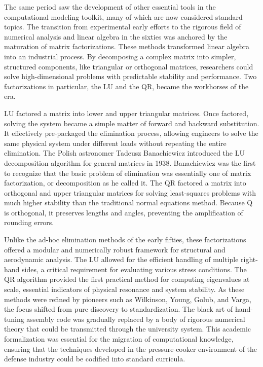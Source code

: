 The same period saw the development of other essential tools in the computational modeling toolkit, many of which are now considered standard topics. The transition from experimental early efforts to the rigorous field of numerical analysis and linear algebra in the sixties was anchored by the maturation of matrix factorizations. These methods transformed linear algebra into an industrial process. By decomposing a complex matrix into simpler, structured components, like triangular or orthogonal matrices, researchers could solve high-dimensional problems with predictable stability and performance. Two factorizations in particular, the LU and the QR, became the workhorses of the era. 

LU factored a matrix into lower and upper triangular matrices. Once factored, solving the system became a simple matter of forward and backward substitution. It effectively pre-packaged the elimination process, allowing engineers to solve the same physical system under different loads without repeating the entire elimination. The Polish astronomer Tadeusz Banachiewicz introduced the LU decomposition algorithm for general matrices in 1938. Banachiewicz was the first to recognize that the basic problem of elimination was essentially one of matrix factorization, or decomposition as he called it. The QR factored a matrix into orthogonal and upper triangular matrices for solving least-squares problems with much higher stability than the traditional normal equations method. Because Q is orthogonal, it preserves lengths and angles, preventing the amplification of rounding errors. 

Unlike the ad-hoc elimination methods of the early fifties, these factorizations offered a modular and numerically robust framework for structural and aerodynamic analysis. The LU allowed for the efficient handling of multiple right-hand sides, a critical requirement for evaluating various stress conditions. The QR algorithm provided the first practical method for computing eigenvalues at scale, essential indicators of physical resonance and system stability. As these methods were refined by pioneers such as Wilkinson, Young, Golub, and Varga, the focus shifted from pure discovery to standardization. The black art of hand-tuning assembly code was gradually replaced by a body of rigorous numerical theory that could be transmitted through the university system. This academic formalization was essential for the migration of computational knowledge, ensuring that the techniques developed in the pressure-cooker environment of the defense industry could be codified into standard curricula. 

